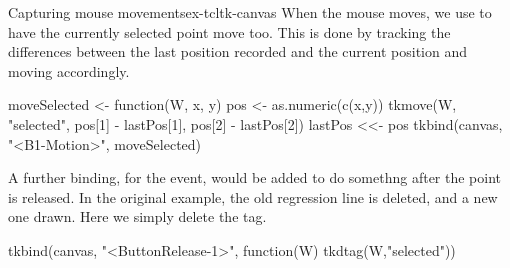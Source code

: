 \begin{example}{Capturing mouse movements}{ex-tcltk-canvas}
When the mouse moves, we use  to have the currently
selected point move too. This is done by tracking the differences
between the last position recorded and the current position and moving
accordingly.
\begin{Schunk}
\begin{Sinput}
 moveSelected <- function(W, x, y) {
   pos <- as.numeric(c(x,y))
   tkmove(W, "selected", pos[1] - lastPos[1], 
                         pos[2] - lastPos[2])
   lastPos <<- pos
 }
 tkbind(canvas, "<B1-Motion>", moveSelected)
\end{Sinput}
\end{Schunk}

A further binding, for the  event, would be
added to do somethng after the point is released. In the original
example, the old regression line is deleted, and a new one drawn. Here
we simply delete the  tag.
\begin{Schunk}
\begin{Sinput}
 tkbind(canvas, "<ButtonRelease-1>", 
        function(W) tkdtag(W,"selected"))
\end{Sinput}
\end{Schunk}


\end{example}





